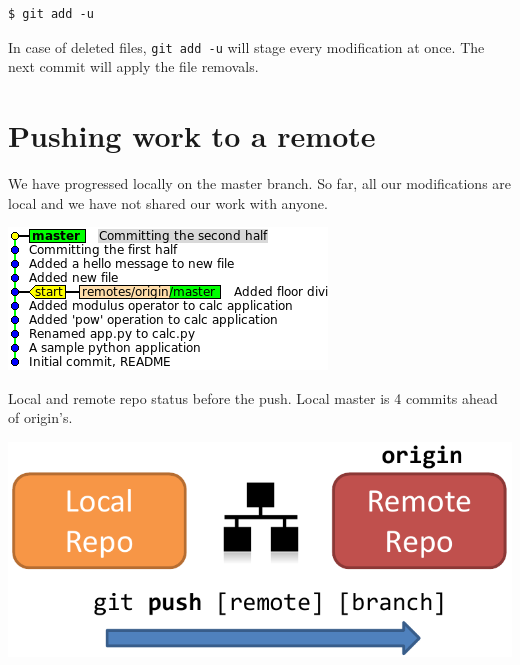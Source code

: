 \documentclass{../common/tufte-latex/tufte-handout}
\begin{document}
\begin{lstlisting}[style=BashInputStyle]
  $ git add -u
\end{lstlisting}

In case of deleted files, \texttt{git add -u} will stage every modification at once.
The next commit will apply the file removals.

\pagebreak

\section{Pushing work to a remote}

We have progressed locally on the master branch.
So far, all our modifications are local and we have not shared our work with anyone.

\begin{marginfigure}%
  \centering
  \includegraphics[width=\linewidth]{gitcommit-pre-push.png}
  \label{fig:gitcommit-pre-push}
  \caption{Local and remote repo status before the push. Local master is 4 commits ahead of origin's.}
\end{marginfigure}
\begin{marginfigure}%
  \centering
  \includegraphics[width=\linewidth]{gitpush-schema.pdf}
  \label{fig:gitpush-schema}
\end{marginfigure}
\end{document}
